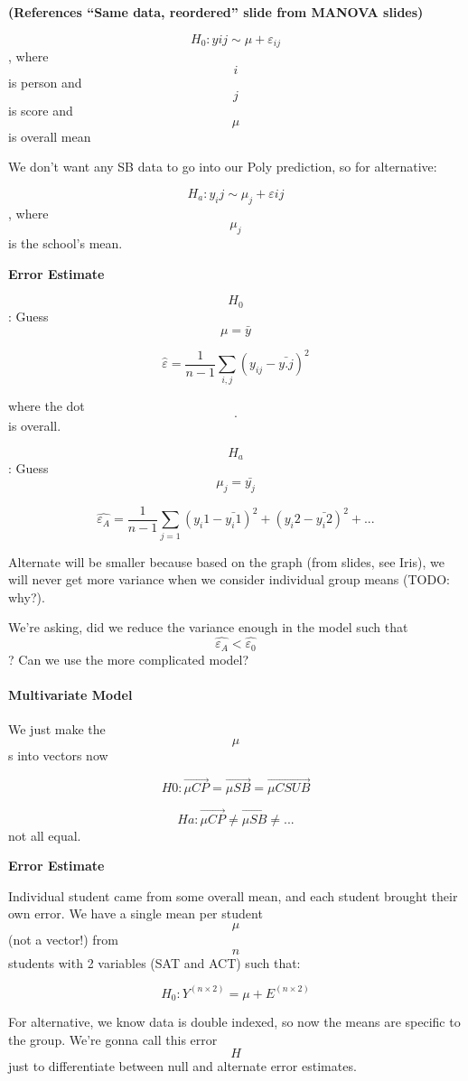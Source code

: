 \textbf{(References ``Same data, reordered'' slide from MANOVA slides)}

\[H_0: y{ij} \sim \mu + \varepsilon_{ij}\], where \[i\] is person and
\[j\] is score and \[\mu\] is overall mean

We don't want any SB data to go into our Poly prediction, so for
alternative:

\[H_a: y_ij \sim \mu_j + \varepsilon{ij} \], where \[\mu_j\] is the
school's mean.

\textbf{Error Estimate}

\[H_0\]: Guess \[\mu = \bar{y}\]

\[\hat{\varepsilon} = \frac{1}{n-1} \sum_{i,j} (y_{ij} - \bar{y.j})^2\]

where the dot \[.\] is overall.

\[H_a\]: Guess \[\mu_j = \bar{y_j} \]

\[\hat{\varepsilon_A} = \frac{1}{n-1} \sum_{j = 1} (y_i1 - \bar{y_i1})^2 + (y_i2 - \bar{y_i2})^2 + ...\]

Alternate will be smaller because based on the graph (from slides, see
Iris), we will never get more variance when we consider individual group
means (TODO: why?).

We're asking, did we reduce the variance enough in the model such that
\[ \hat{\varepsilon_A} < \hat{\varepsilon_0} \]? Can we use the more
complicated model?

\hypertarget{multivariate-model}{%
\paragraph{Multivariate Model}\label{multivariate-model}}

We just make the \[ \mu \]s into vectors now

\[H0: \vec{\mu{CP}} = \vec{\mu{SB}} = \vec{\mu{CSU B}} \]

\[Ha: \vec{\mu{CP}} \ne \vec{\mu{SB}} \ne ... \] not all equal.

\textbf{Error Estimate}

Individual student came from some overall mean, and each student brought
their own error. We have a single mean per student \[\mu\] (not a
vector!) from \[n\] students with 2 variables (SAT and ACT) such that:

\[ H_0: Y^{(n \times 2)} = \mu + E^{(n \times 2)} \]

For alternative, we know data is double indexed, so now the means are
specific to the group. We're gonna call this error \[H\] just to
differentiate between null and alternate error estimates.

